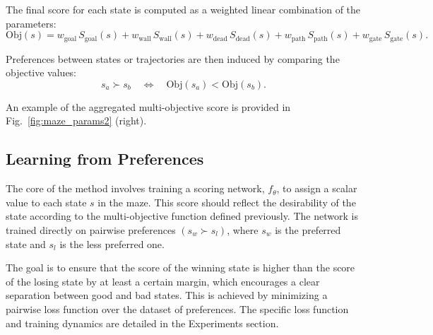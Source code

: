 \documentclass[a4paper,oneside,10pt,ngerman,english]{scrartcl}
\begin{document}
The final score for each state is computed as a weighted linear combination of the parameters:
\[
\text{Obj}(s) = w_{\text{goal}} \, S_{\text{goal}}(s) 
+ w_{\text{wall}} \, S_{\text{wall}}(s) 
+ w_{\text{dead}} \, S_{\text{dead}}(s) 
+ w_{\text{path}} \, S_{\text{path}}(s) 
+ w_{\text{gate}} \, S_{\text{gate}}(s).
\]

Preferences between states or trajectories are then induced by comparing the objective values:
\[
s_a \succ s_b \quad \Leftrightarrow \quad \text{Obj}(s_a) < \text{Obj}(s_b).
\]

An example of the aggregated multi-objective score is provided in Fig.~\ref{fig:maze_params2} (right).

\subsection{Learning from Preferences}

The core of the method involves training a scoring network, $f_\theta$, to assign a scalar value to each state $s$ in the maze. This score should reflect the desirability of the state according to the multi-objective function defined previously. The network is trained directly on pairwise preferences $(s_w \succ s_l)$, where $s_w$ is the preferred state and $s_l$ is the less preferred one.

The goal is to ensure that the score of the winning state is higher than the score of the losing state by at least a certain margin, which encourages a clear separation between good and bad states. This is achieved by minimizing a pairwise loss function over the dataset of preferences. The specific loss function and training dynamics are detailed in the Experiments section.
\end{document}
